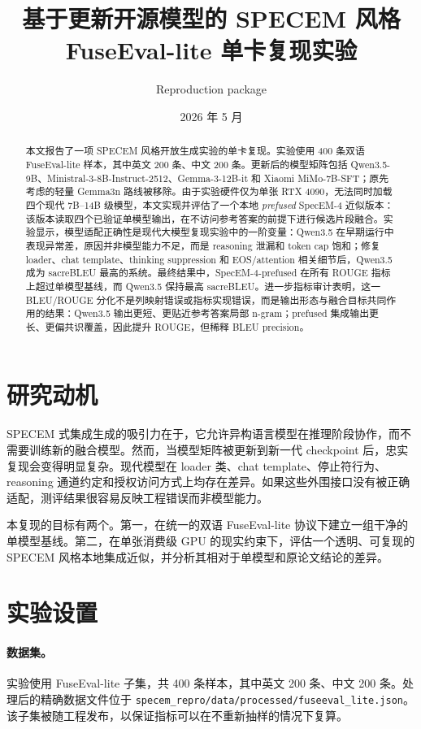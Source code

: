 \documentclass[11pt]{ctexart}
\title{基于更新开源模型的 SPECEM 风格 FuseEval-lite 单卡复现实验}
\author{Reproduction package}
\date{2026 年 5 月}
\begin{document}
\maketitle

\begin{abstract}
本文报告了一项 SPECEM 风格开放生成实验的单卡复现。实验使用 400 条双语 FuseEval-lite 样本，其中英文 200 条、中文 200 条。更新后的模型矩阵包括 Qwen3.5-9B、Ministral-3-8B-Instruct-2512、Gemma-3-12B-it 和 Xiaomi MiMo-7B-SFT；原先考虑的轻量 Gemma3n 路线被移除。由于实验硬件仅为单张 RTX 4090，无法同时加载四个现代 7B--14B 级模型，本文实现并评估了一个本地 \emph{prefused} SpecEM-4 近似版本：该版本读取四个已验证单模型输出，在不访问参考答案的前提下进行候选片段融合。实验显示，模型适配正确性是现代大模型复现实验中的一阶变量：Qwen3.5 在早期运行中表现异常差，原因并非模型能力不足，而是 reasoning 泄漏和 token cap 饱和；修复 loader、chat template、thinking suppression 和 EOS/attention 相关细节后，Qwen3.5 成为 sacreBLEU 最高的系统。最终结果中，SpecEM-4-prefused 在所有 ROUGE 指标上超过单模型基线，而 Qwen3.5 保持最高 sacreBLEU。进一步指标审计表明，这一 BLEU/ROUGE 分化不是列映射错误或指标实现错误，而是输出形态与融合目标共同作用的结果：Qwen3.5 输出更短、更贴近参考答案局部 n-gram；prefused 集成输出更长、更偏共识覆盖，因此提升 ROUGE，但稀释 BLEU precision。
\end{abstract}

\section{研究动机}
SPECEM 式集成生成的吸引力在于，它允许异构语言模型在推理阶段协作，而不需要训练新的融合模型。然而，当模型矩阵被更新到新一代 checkpoint 后，忠实复现会变得明显复杂。现代模型在 loader 类、chat template、停止符行为、reasoning 通道约定和授权访问方式上均存在差异。如果这些外围接口没有被正确适配，测评结果很容易反映工程错误而非模型能力。

本复现的目标有两个。第一，在统一的双语 FuseEval-lite 协议下建立一组干净的单模型基线。第二，在单张消费级 GPU 的现实约束下，评估一个透明、可复现的 SPECEM 风格本地集成近似，并分析其相对于单模型和原论文结论的差异。

\section{实验设置}
\paragraph{数据集。}
实验使用 FuseEval-lite 子集，共 400 条样本，其中英文 200 条、中文 200 条。处理后的精确数据文件位于 \texttt{specem\_repro/data/processed/fuseeval\_lite.json}。该子集被随工程发布，以保证指标可以在不重新抽样的情况下复算。
\end{document}
